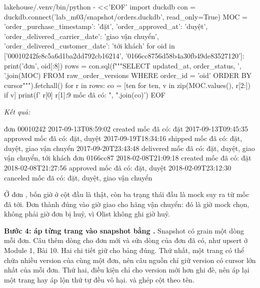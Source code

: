 \begin{codeblock}
lakehouse/.venv/bin/python - <<'EOF'
import duckdb
con = duckdb.connect('lab_m03/snapshot/orders.duckdb', read_only=True)
MOC = {'order_purchase_timestamp': 'đặt', 'order_approved_at': 'duyệt',
       'order_delivered_carrier_date': 'giao vận chuyển',
       'order_delivered_customer_date': 'tới khách'}
for oid in ['00010242fe8c5a6d1ba2dd792cb16214', '0166cc8756d58b4a30fb49de83527120']:
    print('đơn', oid[:8])
    rows = con.sql(f"""SELECT updated_at, order_status, {', '.join(MOC)}
                       FROM raw_order_versions WHERE order_id = '{oid}'
                       ORDER BY cursor""").fetchall()
    for r in rows:
        co = [ten for ten, v in zip(MOC.values(), r[2:]) if v]
        print(f'  {r[0]}  {r[1]:9}  mốc đã có: {", ".join(co)}')
EOF
\end{codeblock}
\textit{Kết quả:}
\begin{codeblock}
đơn 00010242
  2017-09-13T08:59:02  created    mốc đã có: đặt
  2017-09-13T09:45:35  approved   mốc đã có: đặt, duyệt
  2017-09-19T18:34:16  shipped    mốc đã có: đặt, duyệt, giao vận chuyển
  2017-09-20T23:43:48  delivered  mốc đã có: đặt, duyệt, giao vận chuyển, tới khách
đơn 0166cc87
  2018-02-08T21:09:18  created    mốc đã có: đặt
  2018-02-08T21:27:56  approved   mốc đã có: đặt, duyệt
  2018-02-09T23:12:30  canceled   mốc đã có: đặt, duyệt, giao vận chuyển
\end{codeblock}

Ở đơn , bốn giờ ở cột đầu là thật, còn ba trạng thái đầu là mock suy ra từ mốc đã tới. Đơn  thành  đúng vào giờ giao cho hãng vận chuyển: đó là giờ mock chọn, không phải giờ đơn bị huỷ, vì Olist không ghi giờ huỷ.

\textbf{Bước 4: áp từng trang vào snapshot bằng .} Snapshot có grain một dòng mỗi đơn. Câu  thêm dòng cho đơn mới và sửa dòng của đơn đã có, như upsert ở Module 1, Bài 10. Hai chi tiết giữ cho bảng đúng. Thứ nhất, một trang có thể chứa nhiều version của cùng một đơn, nên câu nguồn chỉ giữ version có cursor lớn nhất của mỗi đơn. Thứ hai, điều kiện  chỉ cho version mới hơn ghi đè, nên áp lại một trang hay áp lộn thứ tự đều vô hại.  và  ghép cột theo tên.

